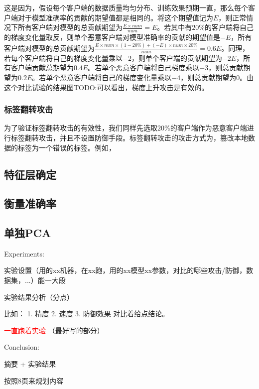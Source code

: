 \documentclass[conference]{IEEEtran}
\begin{document}
这是因为，假设每个客户端的数据质量均匀分布、训练效果预期一直，那么每个客户端对于模型准确率的贡献的期望值都是相同的。将这个期望值记为$E$，则正常情况下所有客户端对模型的总贡献期望为$\frac{E\times num}{num}=E$。若其中有$20\%$的客户端将自己的梯度变化量取反，则单个恶意客户端对模型准确率的贡献的期望值是$-E$，所有客户端对模型的总贡献期望为$\frac{E\times num\times(1-20\%)+(-E)\times num\times 20\%}{num} = 0.6E$。同理，若每个客户端将自己的梯度变化量乘以$-2$，则单个客户端的贡献期望为$-2E$，所有客户端贡献总期望为$0.4E$。若单个恶意客户端将自己梯度乘以$-3$，则总贡献期望为$0.2E$。若单个恶意客户端将自己的梯度变化量乘以$-4$，则总贡献期望为$0$。由这个对比试验的结果图TODO:可以看出，梯度上升攻击是有效的。

\subsubsection{\textbf{标签翻转攻击}}
\label{exp:attack:label}

为了验证标签翻转攻击的有效性，我们同样先选取$20\%$的客户端作为恶意客户端进行标签翻转攻击，并且不设置防御手段。标签翻转攻击的攻击方式为，篡改本地数据的标签为一个错误的标签。例如，


\subsection{特征层确定}
\label{exp:exp_layer}



\subsection{衡量准确率}

\subsection{单独PCA}


Experiments:

实验设置（用的xx机器，在xx跑，用的xx模型xx参数，对比的哪些攻击/防御，数据集，...）能一大段

实验结果分析（分点）

比如：
1. 精度
2. 速度
3. 防御效果
对比着给点结论。

\textcolor{red}{一直跑着实验}
（最好写的部分）


Conclusion:

摘要 + 实验结果



按照8页来规划内容
\end{document}
